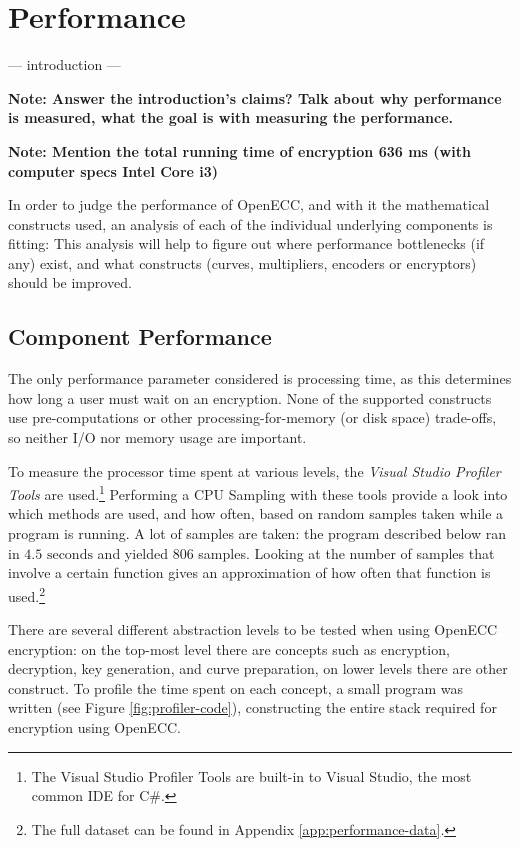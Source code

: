 \section{Performance}
\label{sec:performance}

 --- introduction ---
 
 \textbf{Note: Answer the introduction's claims? Talk about why performance is measured, what the goal is with measuring the
 performance.}
 
 \textbf{Note: Mention the total running time of encryption 636 ms (with computer specs Intel Core i3)}
 
 In order to judge the performance of OpenECC, and with it the mathematical constructs used, an analysis of each of the
 individual underlying components is fitting: This analysis will help to figure out where performance bottlenecks (if
 any) exist, and what constructs (curves, multipliers, encoders or encryptors) should be improved.

\subsection{Component Performance}
\label{sec:performance_components}

The only performance parameter considered is processing time, as this determines how long a user must wait on an encryption.
None of the supported constructs use pre-computations or other processing-for-memory (or disk space) trade-offs, so neither
I/O nor memory usage are important.

To measure the processor time spent at various levels, the \emph{Visual Studio Profiler Tools} are used.\footnote{The Visual
Studio Profiler Tools are built-in to Visual Studio, the most common IDE for C\#.} Performing a CPU Sampling with these tools
provide a look into which methods are used, and how often, based on random samples taken while a program is running. A lot of
samples are taken: the program described below ran in \(4.5 \text{ seconds}\) and yielded 806 samples. Looking at the number of samples
that involve a certain function gives an approximation of how often that function is used.\footnote{The full dataset can be
found in Appendix \ref{app:performance-data}.}

There are several different abstraction levels to be tested when using OpenECC encryption: on the top-most level there are concepts
such as encryption, decryption, key generation, and curve preparation, on lower levels there are other construct. To profile the time
spent on each concept, a small program was written (see Figure \ref{fig:profiler-code}), constructing the entire stack required for
encryption using OpenECC.

